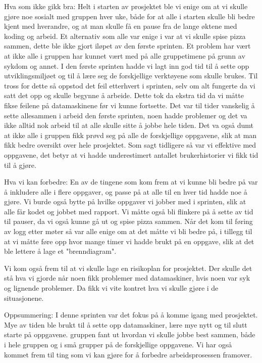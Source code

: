 \documentclass[12pt,a4paper,norsk]{article}
\begin{document}
Hva som ikke gikk bra:
Helt i starten av prosjektet ble vi enige om at vi skulle gjøre noe sosialt med gruppen hver uke, både for at alle i starten skulle bli bedre kjent med hverandre, og at man skulle få en pause fra de lange øktene med koding og arbeid. Et alternativ som alle var enige i var at vi skulle spise pizza sammen, dette ble ikke gjort iløpet av den første sprinten.  
Et problem har vært at ikke alle i gruppen har kunnet vært med på alle gruppetimene på grunn av sykdom og annet. 
I den første sprinten hadde vi lagt inn god tid til å sette opp utviklingsmiljøet og til å lære seg de forskjellige verktøyene som skulle brukes. Til tross for dette så oppstod det feil etterhvert i sprinten, selv om alt fungerte da vi satt det opp og skulle begynne å arbeide. Dette tok da ekstra tid da vi måtte fikse feilene på datamaskinene før vi kunne fortsette. 
Det var til tider vanskelig å sette allesammen i arbeid den første sprinten, noen hadde problemer og det va ikke alltid nok arbeid til at alle skulle sitte å jobbe hele tiden. Det va også dumt at ikke alle i gruppen fikk prøvd seg på alle de forskjellige oppgavene, slik at man fikk bedre oversikt over hele prosjektet. 
Som sagt tidligere så var vi effektive med oppgavene, det betyr at vi hadde underestimert antallet brukerhistorier vi fikk tid til å gjøre.


Hva vi kan forbedre:
En av de tingene som kom frem at vi kunne bli bedre på var å inkludere alle i flere oppgaver, og passe på at alle til en hver tid hadde noe å gjøre. Vi burde også bytte på hvilke oppgaver vi jobber med i sprinten, slik at alle får kodet og jobbet med rapport.
Vi måtte også bli flinkere på å sette av tid til pauser, da vi også kunne gå ut og spise pizza sammen. 
Når det kom til føring av logg etter møter så var alle enige om at det måtte vi bli bedre på, i tillegg til at vi måtte føre opp hvor mange timer vi hadde brukt på en oppgave, slik at det ble lettere å lage et "brenndiagram".

Vi kom også frem til at vi skulle lage en risikoplan for prosjektet. Der skulle det stå hva vi gjorde når noen fikk problemer med datamaskiner, hvis noen var syk og lignende problemer. Da fikk vi vite kontret hva vi skulle gjøre i de situasjonene. 

Oppsummering:
I denne sprinten var det fokus på å komme igang med prosjektet. Mye av tiden ble brukt til å sette opp datamaskiner, lære mye nytt og til slutt starte på oppgavene. gruppen fant ut hvordan vi skulle jobbe best sammen, både i hele gruppen og i små grupper på de forskjellige oppgavene. Vi har også kommet frem til ting som vi kan gjøre for å forbedre arbeidsprosessen framover. 
\end{document}
